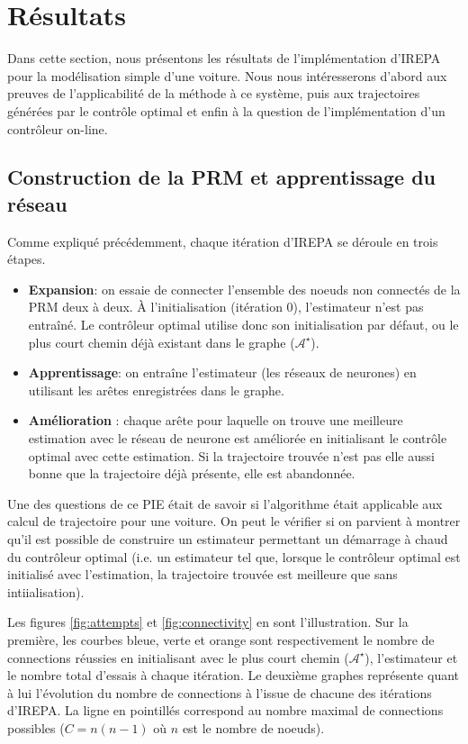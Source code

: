 \documentclass[a4paper,12pt]{report}
\newcommand{\itemo}{\item[\textsf{o}]}
\begin{document}
\section{Résultats}
Dans cette section, nous présentons les résultats de l'implémentation d'IREPA pour la modélisation simple d'une voiture. Nous nous intéresserons d'abord aux preuves de l'applicabilité de la méthode à ce système, puis aux trajectoires générées par le contrôle optimal et enfin à la question de l'implémentation d'un contrôleur on-line.

\subsection{Construction de la PRM et apprentissage du réseau}

Comme expliqué précédemment, chaque itération d'IREPA se déroule en trois étapes.
\begin{itemize}
	\itemo \textbf{Expansion}: on essaie de connecter l'ensemble des noeuds non connectés de la PRM deux à deux. À l'initialisation (itération 0), l'estimateur n'est pas entraîné. Le contrôleur optimal utilise donc son initialisation par défaut, ou le plus court chemin déjà existant dans le graphe ($\mathcal{A}^\star$).
	\itemo \textbf{Apprentissage}: on entraîne l'estimateur (les réseaux de neurones) en utilisant les arêtes enregistrées dans le graphe.
	\itemo \textbf{Amélioration} : chaque arête pour laquelle on trouve une meilleure estimation avec le réseau de neurone est améliorée en initialisant le contrôle optimal avec cette estimation. Si la trajectoire trouvée n'est pas elle aussi bonne que la trajectoire déjà présente, elle est abandonnée.
\end{itemize}

\vspace{0.5cm}

Une des questions de ce PIE était de savoir si l'algorithme était applicable aux calcul de trajectoire pour une voiture. On peut le vérifier si on parvient à montrer qu'il est possible de construire un estimateur permettant un démarrage à chaud du contrôleur optimal (i.e. un estimateur tel que, lorsque le contrôleur optimal est initialisé avec l'estimation, la trajectoire trouvée est meilleure que sans intiialisation). 

Les figures \ref{fig:attempts} et \ref{fig:connectivity} en sont l'illustration. Sur la première, les courbes bleue, verte et orange sont respectivement le nombre de connections réussies en initialisant avec le plus court chemin ($\mathcal{A}^\star$), l'estimateur et le nombre total d'essais à chaque itération. Le deuxième graphes représente quant à lui l'évolution du nombre de connections à l'issue de chacune des itérations d'IREPA. La ligne en pointillés correspond au nombre maximal de connections possibles ($C=n(n-1)$ où $n$ est le nombre de noeuds).
\end{document}
